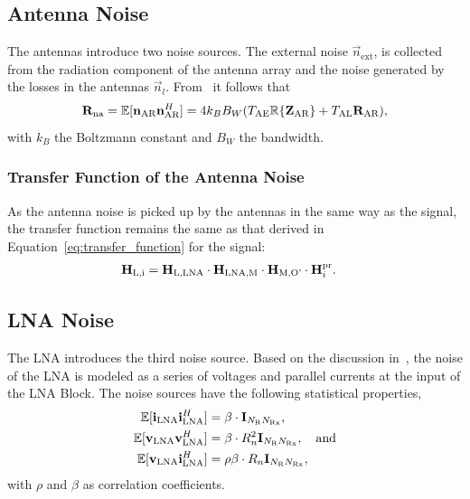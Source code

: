 \subsection{Antenna Noise}
\label{sec:antenna_noise}

The antennas introduce two noise sources.
The external noise $\vec{n}_\text{ext}$, is collected from the radiation component of the antenna array and the noise generated by the losses in the antennas $\vec{n}_l$.
From~\cite{Twiss1955} it follows that 
\begin{equation}
\label{eq:cov_ant}
\mathbf{R}_\text{na} = \mathbb{E}[\mathbf{n}_\text{AR}\mathbf{n}_\text{AR}^H] = 4 k_B B_W(T_\text{AE}\mathbb{R}\{\mathbf{Z}_\text{AR}\}+T_\text{AL}\mathbf{R}_\text{AR}),
\end{equation}
with $k_B$ the Boltzmann constant and $B_W$ the bandwidth.

\subsubsection{Transfer Function of the Antenna Noise}
\label{sec:antenna_noise_transf}
As the antenna noise is picked up by the antennas in the same way as the signal, the transfer function remains the same as that derived in Equation~\eqref{eq:transfer_function} for the signal:
\begin{align}
\mathbf{H}_\text{L,i} &= \mathbf{H}_\text{L,LNA}\cdot\mathbf{H}_\text{LNA,M}\cdot\mathbf{H}_\text{M,O'} \cdot \mathbf{H}_i^{\text{pr}}.
\end{align}

\subsection{LNA Noise}
\label{sec:lna_noise}

The LNA introduces the third noise source.
Based on the discussion in~\cite{Nossek}, the noise of the LNA is modeled as a series of voltages and parallel currents at the input of the LNA Block.
The noise sources have the following statistical properties,
\begin{align}
\label{eq:cov_lna}
\mathbb{E}[\mathbf{i}_\text{LNA}\mathbf{i}_\text{LNA}^H] &= \beta \cdot \mathbf{I}_{N_\text{R}N_\text{Rx}},\\\nonumber
\mathbb{E}[\mathbf{v}_\text{LNA}\mathbf{v}_\text{LNA}^H] &= \beta \cdot R_n^2\mathbf{I}_{N_\text{R}N_\text{Rx}},\quad\text{and}\\\nonumber
\mathbb{E}[\mathbf{v}_\text{LNA}\mathbf{i}_\text{LNA}^H] &= \rho \beta \cdot R_n\mathbf{I}_{N_\text{R}N_\text{Rx}},
\end{align}
with $\rho$ and $\beta$ as correlation coefficients.

